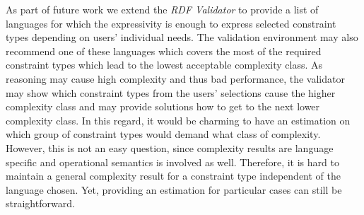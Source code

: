 \documentclass{acm_proc_article-sp}
\begin{document}
As part of future work we extend the \emph{RDF Validator} to provide a list of languages for which the expressivity is enough to express selected constraint types
depending on users' individual needs.
The validation environment may also recommend one of these languages which covers the most of the required constraint types which lead to the lowest acceptable complexity class.
As reasoning may cause high complexity and thus bad performance, the validator may show which constraint types from the users' selections cause the higher complexity class 
and may provide solutions how to get to the next lower complexity class. 
In this regard, it would be charming to have an estimation on which group of constraint types would demand what class of complexity. However, this is not an easy question, since complexity results are language specific and operational semantics is involved as well. Therefore, it is hard to maintain a general complexity result for a constraint type independent of the language chosen. Yet, providing an estimation for particular cases can still be straightforward.
\end{document}

